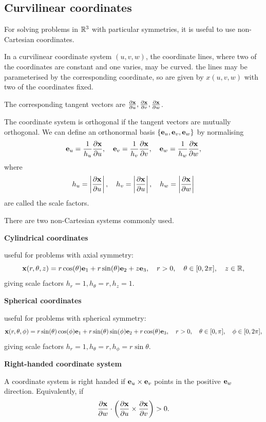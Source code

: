 \documentclass[10pt, a4paper]{article}
\begin{document}
\subsection{Curvilinear coordinates}
For solving problems in $\mathbb{R} ^ 3$ with particular symmetries,
it is useful to use non-Cartesian coordinates.

In a curvilinear coordinate system $(u, v, w)$,
the coordinate lines,
where two of the coordinates are constant and one varies,
may be curved.
the lines may be parameterised by the corresponding coordinate,
so are given by $x(u, v, w)$ with two of the coordinates fixed.

The corresponding tangent vectors are $\frac{\partial \mathbf{x}}{\partial u}, \frac{\partial \mathbf{x}}{\partial v}, \frac{\partial \mathbf{x}}{\partial w}$.

The coordinate system is orthogonal if the tangent vectors are mutually orthogonal.
We can define an orthonormal basis $\{\mathbf{e}_u, \mathbf{e}_v, \mathbf{e}_w\}$ by normalising
\[
\mathbf{e}_u = \frac{1}{h_u}\frac{\partial \mathbf{x}}{\partial u},\quad\mathbf{e}_v = \frac{1}{h_v}\frac{\partial \mathbf{x}}{\partial v},\quad\mathbf{e}_w = \frac{1}{h_w}\frac{\partial \mathbf{x}}{\partial w},
\]
where
\[
h_u = \left|\frac{\partial \mathbf{x}}{\partial u}\right|,\quad h_v = \left|\frac{\partial \mathbf{x}}{\partial u}\right|,\quad h_w = \left|\frac{\partial \mathbf{x}}{\partial w}\right|
\]
are called the scale factors.

There are two non-Cartesian systems commonly used.

\textbf{Cylindrical coordinates}

useful for problems with axial symmetry:
\[
\mathbf{x}(r, \theta, z) = r\cos(\theta)\mathbf{e}_1 + r\sin(\theta)\mathbf{e}_2 + z\mathbf{e}_3,\quad r > 0,\quad \theta \in [0, 2\pi],\quad z \in \mathbb{R},
\]
giving scale factors $h_r = 1, h_{\theta} = r, h_z = 1$.

\textbf{Spherical coordinates}

useful for problems with spherical symmetry:
\[
\mathbf{x}(r, \theta, \phi) = r\sin(\theta)\cos(\phi)\mathbf{e}_1 + r\sin(\theta)\sin(\phi)\mathbf{e}_2 + r\cos(\theta)\mathbf{e}_3,\quad r > 0,\quad \theta \in [0, \pi], \quad \phi \in [0, 2\pi],
\]
giving scale factors $h_r = 1, h_{\theta} = r, h_{\phi} = r\sin{\theta}$.



\textbf{Right-handed coordinate system}

A coordinate system is right handed if $\mathbf{e}_u \times \mathbf{e}_v$ points in the positive $\mathbf{e}_w$ direction.
Equivalently,
if
\[
\frac{\partial \mathbf{x}}{\partial w} \cdot \left(\frac{\partial \mathbf{x}}{\partial u} \times \frac{\partial \mathbf{x}}{\partial v}\right) > 0.
\]
\end{document}
